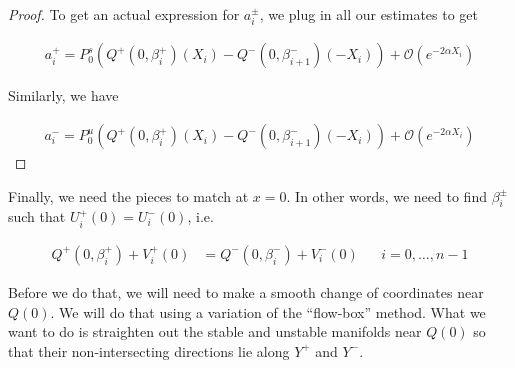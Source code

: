 \documentclass[thesis.tex]{subfiles}
\begin{document}
\begin{lemma}
\begin{proof}
To get an actual expression for $a_i^\pm$, we plug in all our estimates to get

\begin{align*}
a_i^+ = P^s_0 \left( Q^+(0, \beta_i^+)(X_i) - Q^-(0, \beta_{i+1}^-)(-X_i) \right) 
+ \mathcal{O}( e^{-2 \alpha X_i} )
\end{align*}

Similarly, we have

\begin{align*}
a_i^- = P^u_0 \left( Q^+(0, \beta_i^+)(X_i) - Q^-(0, \beta_{i+1}^-)(-X_i) \right) 
+ \mathcal{O}( e^{-2 \alpha X_i} )
\end{align*}

\end{proof}
\end{lemma}

Finally, we need the pieces to match at $x = 0$. In other words, we need to find $\beta_i^\pm$ such that $U_i^+(0) = U_i^-(0)$, i.e. 

\begin{align*}
Q^+(0, \beta_i^+) + V_i^+(0) &= Q^-(0, \beta_i^-) + V_i^-(0) && i = 0, \dots, n-1
\end{align*}

Before we do that, we will need to make a smooth change of coordinates near $Q(0)$. We will do that using a variation of the ``flow-box'' method. What we want to do is straighten out the stable and unstable manifolds near $Q(0)$ so that their non-intersecting directions lie along $Y^+$ and $Y^-$.

\end{document}
